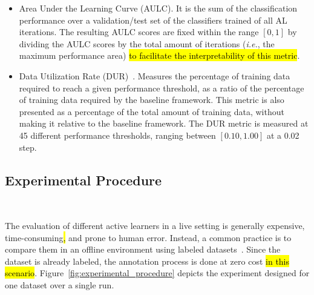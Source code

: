 \documentclass[preprint, 12pt]{elsarticle}
\begin{document}
\begin{itemize}

    \item Area Under the Learning Curve (AULC). It is the sum of the
        classification performance over a validation/test set of the
        classifiers trained of all AL iterations. The resulting AULC scores are fixed
        within the range $[0, 1]$ by dividing the AULC scores by the total
        amount of iterations (\textit{i.e.}, the maximum performance area)
        \hl{to facilitate the interpretability of this metric}.

    \item Data Utilization Rate (DUR)~\cite{Reitmaier2013}. Measures the
        percentage of training data required to reach a given performance
        threshold, as a ratio of the percentage of training data required by
        the baseline framework. This metric is also presented as a percentage
        of the total amount of training data, without making it relative to
        the baseline framework. The DUR metric is measured at 45 different
        performance thresholds, ranging between $[0.10, 1.00]$ at a 0.02 step.

\end{itemize}
 
\subsection{Experimental Procedure}~\label{sec:experimental_procedure}

The evaluation of different active learners in a live setting is generally
expensive, time-consuming\hl{,} and prone to human error. Instead, a common
practice is to compare them in an offline environment using labeled
datasets~\cite{Kagy2019}. Since the dataset is already labeled, the annotation
process is done at zero cost \hl{in this scenario}.
Figure~\ref{fig:experimental_procedure} depicts the experiment designed for
one dataset over a single run. 
 
\end{document}
